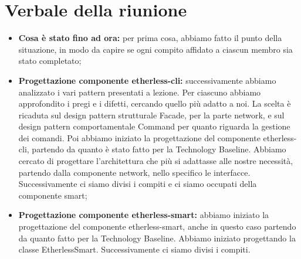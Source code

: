 \section{Verbale della riunione}
	\begin{itemize}
		\item \textbf{Cosa è stato fino ad ora:} per prima cosa, abbiamo fatto il punto della situazione, in modo da capire se ogni compito affidato a ciascun membro sia stato completato;
		\item \textbf{Progettazione componente etherless-cli:} successivamente abbiamo analizzato i vari pattern presentati a lezione. Per ciascuno abbiamo approfondito i pregi e i difetti, cercando quello più adatto a noi. La scelta è ricaduta sul design pattern strutturale Facade, per la parte network, e sul design pattern comportamentale Command per quanto riguarda la gestione dei comandi. Poi abbiamo iniziato la progettazione del componente etherless-cli, partendo da quanto è stato fatto per la Technology Baseline. Abbiamo cercato di progettare l'architettura che più si adattasse alle nostre necessità, partendo dalla componente network, nello specifico le interfacce. Successivamente ci siamo divisi i compiti e ci siamo occupati della componente smart;
		\item \textbf{Progettazione componente etherless-smart:} abbiamo  iniziato la progettazione del componente etherless-smart, anche in questo caso partendo da quanto fatto per la Technology Baseline. Abbiamo iniziato progettando la classe EtherlessSmart. Successivamente ci siamo divisi i compiti.
	\end{itemize}